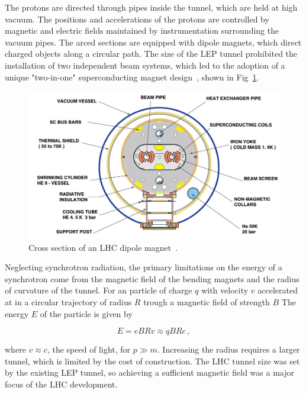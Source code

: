 The protons are directed through pipes inside the tunnel, which are held
at high vacuum. The positions and accelerations of the protons are controlled 
by magnetic and electric fields maintained by instrumentation surrounding the 
vacuum pipes. The arced sections are equipped with dipole magnets,
which direct charged objects along a circular path.
The size of the LEP tunnel prohibited the installation of two independent beam
systems, which led to the adoption of a unique "two-in-one" superconducting
magnet design~\cite{}, shown in Fig~\ref{fig:dipoleXsec}. 

\begin{figure}[htbp]
  \centering
   \includegraphics[width=\textwidth]{figures/LHCandCMS/dipoleXSec.jpeg}
  \caption{
    Cross section of an LHC dipole magnet~\cite{Jean-Luc:841539}.
        }
 \label{fig:dipoleXsec}
\end{figure}

Neglecting synchrotron radiation,
the primary limitations on the energy of a synchrotron come
from the magnetic field of the bending magnets and the radius of curvature
of the tunnel. For an particle of charge $q$ with velocity $v$ accelerated at
in a circular 
trajectory of radius $R$ trough a magnetic field of strength $B$
The energy $E$ of the particle is given by

\begin{equation}
  E = eBRv \approx qBRc \,,
\label{eq:beamEnergy}
\end{equation}

where $v \approx c$, the speed of light, for $p \gg m$. Increasing the radius
requires a larger tunnel, which is limited by the cost of construction. 
The LHC tunnel size was set by the existing LEP tunnel, so achieving
a sufficient magnetic field was a major focus of the LHC development. 

